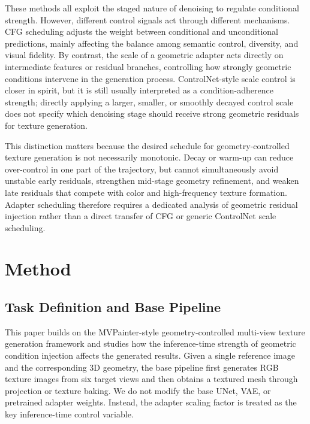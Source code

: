 \documentclass[times,twocolumn,final]{elsarticle}
\begin{document}
These methods all exploit the staged nature of denoising to regulate conditional strength. However, different control signals act through different mechanisms. CFG scheduling adjusts the weight between conditional and unconditional predictions, mainly affecting the balance among semantic control, diversity, and visual fidelity. By contrast, the scale of a geometric adapter acts directly on intermediate features or residual branches, controlling how strongly geometric conditions intervene in the generation process. ControlNet-style scale control is closer in spirit, but it is still usually interpreted as a condition-adherence strength; directly applying a larger, smaller, or smoothly decayed control scale does not specify which denoising stage should receive strong geometric residuals for texture generation.

This distinction matters because the desired schedule for geometry-controlled texture generation is not necessarily monotonic. Decay or warm-up can reduce over-control in one part of the trajectory, but cannot simultaneously avoid unstable early residuals, strengthen mid-stage geometry refinement, and weaken late residuals that compete with color and high-frequency texture formation. Adapter scheduling therefore requires a dedicated analysis of geometric residual injection rather than a direct transfer of CFG or generic ControlNet scale scheduling.

\section{Method}
\label{sec:method}

\subsection{Task Definition and Base Pipeline}
\label{subsec:task}

This paper builds on the MVPainter-style geometry-controlled multi-view texture generation framework \cite{shao2025mvpainter} and studies how the inference-time strength of geometric condition injection affects the generated results. Given a single reference image and the corresponding 3D geometry, the base pipeline first generates RGB texture images from six target views and then obtains a textured mesh through projection or texture baking. We do not modify the base UNet, VAE, or pretrained adapter weights. Instead, the adapter scaling factor is treated as the key inference-time control variable.
\end{document}
